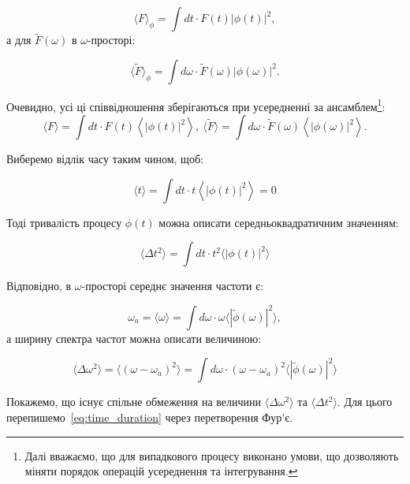 \begin{equation*}
    \langle F \rangle_{\phi} = \int dt \cdot F(t) |\phi(t)|^2,
\end{equation*}
а для \( \tilde{F}(\omega) \) в \( \omega \)-просторі:

\begin{equation*}
    \langle \tilde{F} \rangle_{\phi} = \int d\omega \cdot \tilde{F}(\omega) |\phi(\omega)|^2.
\end{equation*}

Очевидно, усі ці співвідношення зберігаються при усередненні за ансамблем\footnote{Далі вважаємо, що для випадкового процесу виконано умови, що дозволяють міняти порядок операцій усереднення та інтегрування.}:
\begin{equation*}
    \langle F \rangle = \int dt \cdot F(t) \left\langle|\phi(t)|^2\right\rangle,\ \langle \tilde{F} \rangle = \int d\omega \cdot \tilde{F}(\omega) \left\langle |\phi(\omega)|^2\right\rangle.
\end{equation*}


Виберемо відлік часу таким чином, щоб:

\begin{equation*}
    \langle t \rangle = \int dt \cdot t \left\langle|\phi(t)|^2\right\rangle = 0
\end{equation*}

Тоді тривалість процесу \( \phi(t) \) можна описати середньоквадратичним значенням:

\begin{equation}
    \langle \Delta t^2 \rangle = \int dt \cdot t^2 \langle |\phi(t)|^2 \rangle
    \label{eq:time_duration}
\end{equation}

Відповідно, в \( \omega \)-просторі середнє значення частоти є:

\begin{equation*}
    \omega_a = \langle \omega \rangle = \int d\omega \cdot \omega \langle |\tilde\phi(\omega)|^2 \rangle,
\end{equation*}
а ширину спектра частот можна описати величиною:

\begin{equation}
    \langle \Delta \omega^2 \rangle = \langle (\omega - \omega_a)^2 \rangle = \int d\omega \cdot (\omega - \omega_a)^2 \langle |\tilde\phi(\omega)|^2 \rangle
    \label{eq:frequency_width}
\end{equation}

Покажемо, що існує спільне обмеження на величини $\langle \Delta \omega^2 \rangle$ та $\langle \Delta t^2 \rangle$. Для цього перепишемо~\eqref{eq:time_duration} через перетворення Фур’є.

